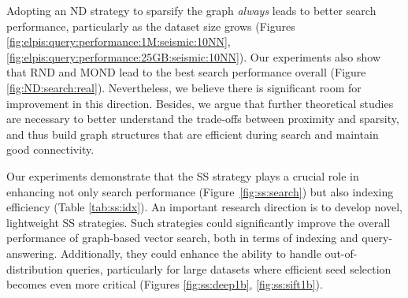  Adopting an ND strategy to sparsify the graph \textit{always} leads to better search performance, particularly as the dataset size grows
(Figures \ref{fig:elpis:query:performance:1M:seismic:10NN}, \ref{fig:elpis:query:performance:25GB:seismic:10NN}). 
Our experiments also show that RND and MOND lead to the best search performance overall (Figure \ref{fig:ND:search:real}). Nevertheless, we believe there is significant room for improvement in this direction. Besides, we argue that further theoretical studies are necessary to better understand the trade-offs between proximity and sparsity, and thus build graph structures 
 that are efficient during search and maintain good connectivity.

 Our experiments demonstrate that the SS strategy plays a crucial role in enhancing not only search performance (Figure~\ref{fig:ss:search}) but also indexing efficiency (Table \ref{tab:ss:idx}). An important research direction is to develop novel, lightweight SS strategies. Such strategies could significantly improve the overall performance of graph-based vector search, both in terms of indexing and query-answering. Additionally, they could enhance the ability to handle out-of-distribution queries, particularly for large datasets where efficient seed selection becomes even more critical (Figures \ref{fig:ss:deep1b}, \ref{fig:ss:sift1b}).


